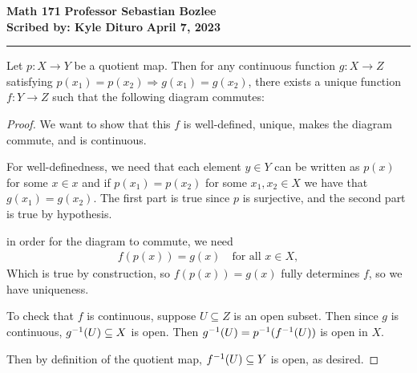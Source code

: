 \documentclass[12pt, twosided]{article}
\begin{document}
\noindent \textbf{Math 171} \hfill \textbf{Professor Sebastian Bozlee} \\
\textbf{Scribed by: Kyle Dituro} \hfill \textbf{April 7, 2023}\hrule
\vspace{.2in}

\begin{thm}
  Let \(p: X \to Y\) be a quotient map. Then for any continuous function \(g: X \to Z\) satisfying \(p(x_1) = p(x_2) \Rightarrow g(x_1) = g(x_2)\), there exists a unique function \(f: Y \to Z\) such that the following diagram commutes:
  \begin{center}
  \end{center}
\end{thm}

\begin{proof}
  We want to show that this \(f\) is well-defined, unique, makes the diagram commute, and is continuous.

  For well-definedness, we need that each element \(y \in Y\) can be written as \(p(x)\) for some \(x \in x\) and if \(p(x_1) = p(x_2)\) for some \(x_1, x_2 \in X\) we have that \(g(x_1) = g(x_2)\). The first part is true since \(p\) is surjective, and the second part is true by hypothesis.

  in order for the diagram to commute, we need
  \begin{align*}
    f(p(x)) = g(x) \quad \text{for all } x\in X,
  \end{align*}
  Which is true by construction, so \(f(p(x)) = g(x)\) fully determines \(f\), so we have uniqueness.

  To check that \(f\) is continuous, suppose \(U \subseteq Z\) is an open subset. Then since \(g\) is continuous, \(g^{-1}(U) \subseteq X\) is open. Then \(g^{-1}(U) = p^{-1}(f^{-1}(U))\) is open in \(X\).

  Then by definition of the quotient map, \(f^{-1}(U) \subseteq Y\) is open, as desired.
\end{proof}
\end{document}
